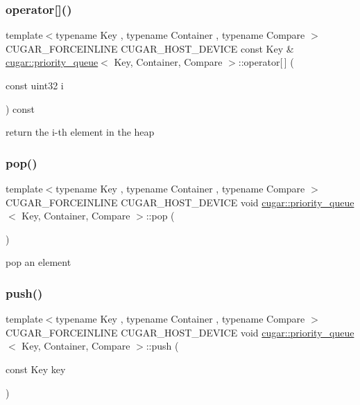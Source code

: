 \subsubsection{\texorpdfstring{operator[]()}{operator[]()}}
{\footnotesize\ttfamily template$<$typename Key , typename Container , typename Compare $>$ \\
C\+U\+G\+A\+R\+\_\+\+F\+O\+R\+C\+E\+I\+N\+L\+I\+NE C\+U\+G\+A\+R\+\_\+\+H\+O\+S\+T\+\_\+\+D\+E\+V\+I\+CE const Key \& \hyperlink{structcugar_1_1priority__queue}{cugar\+::priority\+\_\+queue}$<$ Key, Container, Compare $>$\+::operator\mbox{[}$\,$\mbox{]} (\begin{DoxyParamCaption}\item[{const uint32}]{i }\end{DoxyParamCaption}) const}

return the i-\/th element in the heap \mbox{\label{structcugar_1_1priority__queue_aedb3ffb12d8f0d8515715235e7b518ae}} 
\subsubsection{\texorpdfstring{pop()}{pop()}}
{\footnotesize\ttfamily template$<$typename Key , typename Container , typename Compare $>$ \\
C\+U\+G\+A\+R\+\_\+\+F\+O\+R\+C\+E\+I\+N\+L\+I\+NE C\+U\+G\+A\+R\+\_\+\+H\+O\+S\+T\+\_\+\+D\+E\+V\+I\+CE void \hyperlink{structcugar_1_1priority__queue}{cugar\+::priority\+\_\+queue}$<$ Key, Container, Compare $>$\+::pop (\begin{DoxyParamCaption}{ }\end{DoxyParamCaption})}

pop an element \mbox{\label{structcugar_1_1priority__queue_a4772719e001bba3c9ac2c02f4b12ba83}} 
\subsubsection{\texorpdfstring{push()}{push()}}
{\footnotesize\ttfamily template$<$typename Key , typename Container , typename Compare $>$ \\
C\+U\+G\+A\+R\+\_\+\+F\+O\+R\+C\+E\+I\+N\+L\+I\+NE C\+U\+G\+A\+R\+\_\+\+H\+O\+S\+T\+\_\+\+D\+E\+V\+I\+CE void \hyperlink{structcugar_1_1priority__queue}{cugar\+::priority\+\_\+queue}$<$ Key, Container, Compare $>$\+::push (\begin{DoxyParamCaption}\item[{const Key}]{key }\end{DoxyParamCaption})}

